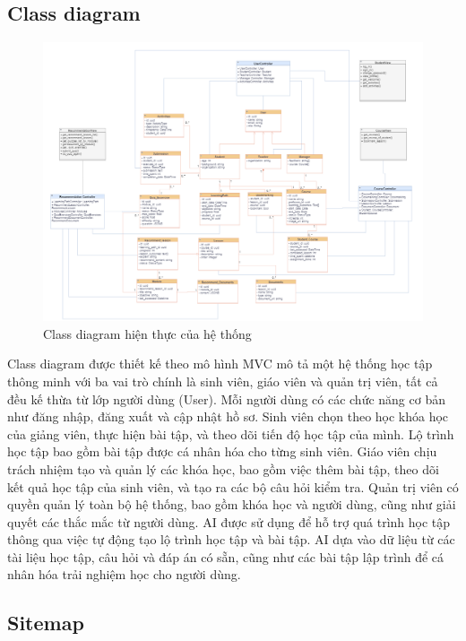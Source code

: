 \subsection{Class diagram}
\begin{figure}[h!]
    \centering
    \includegraphics[width=\linewidth]{Images/Anh/classdiagram.png}
    \caption{Class diagram hiện thực của hệ thống}
    \label{fig:enter-label}
\end{figure}
Class diagram được thiết kế theo mô hình MVC mô tả một hệ thống học tập thông minh với ba vai trò chính là sinh viên, giáo viên và quản trị viên, tất cả đều kế thừa từ lớp người dùng (User). Mỗi người dùng có các chức năng cơ bản như đăng nhập, đăng xuất và cập nhật hồ sơ. Sinh viên chọn theo học khóa học của giảng viên, thực hiện bài tập, và theo dõi tiến độ học tập của mình. Lộ trình học tập bao gồm bài tập được cá nhân hóa cho từng sinh viên. Giáo viên chịu trách nhiệm tạo và quản lý các khóa học, bao gồm việc thêm bài tập, theo dõi kết quả học tập của sinh viên, và tạo ra các bộ câu hỏi kiểm tra. Quản trị viên có quyền quản lý toàn bộ hệ thống, bao gồm khóa học và người dùng, cũng như giải quyết các thắc mắc từ người dùng.
AI được sử dụng để hỗ trợ quá trình học tập thông qua việc tự động tạo lộ trình học tập và bài tập. AI dựa vào dữ liệu từ các tài liệu học tập, câu hỏi và đáp án có sẵn, cũng như các bài tập lập trình để cá nhân hóa trải nghiệm học cho người dùng.
\subsection{Sitemap}

